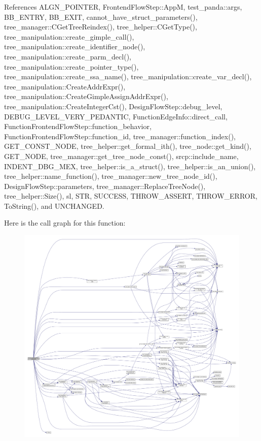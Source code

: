 References A\+L\+G\+N\+\_\+\+P\+O\+I\+N\+T\+ER, Frontend\+Flow\+Step\+::\+AppM, test\+\_\+panda\+::args, B\+B\+\_\+\+E\+N\+T\+RY, B\+B\+\_\+\+E\+X\+IT, cannot\+\_\+have\+\_\+struct\+\_\+parameters(), tree\+\_\+manager\+::\+C\+Get\+Tree\+Reindex(), tree\+\_\+helper\+::\+C\+Get\+Type(), tree\+\_\+manipulation\+::create\+\_\+gimple\+\_\+call(), tree\+\_\+manipulation\+::create\+\_\+identifier\+\_\+node(), tree\+\_\+manipulation\+::create\+\_\+parm\+\_\+decl(), tree\+\_\+manipulation\+::create\+\_\+pointer\+\_\+type(), tree\+\_\+manipulation\+::create\+\_\+ssa\+\_\+name(), tree\+\_\+manipulation\+::create\+\_\+var\+\_\+decl(), tree\+\_\+manipulation\+::\+Create\+Addr\+Expr(), tree\+\_\+manipulation\+::\+Create\+Gimple\+Assign\+Addr\+Expr(), tree\+\_\+manipulation\+::\+Create\+Integer\+Cst(), Design\+Flow\+Step\+::debug\+\_\+level, D\+E\+B\+U\+G\+\_\+\+L\+E\+V\+E\+L\+\_\+\+V\+E\+R\+Y\+\_\+\+P\+E\+D\+A\+N\+T\+IC, Function\+Edge\+Info\+::direct\+\_\+call, Function\+Frontend\+Flow\+Step\+::function\+\_\+behavior, Function\+Frontend\+Flow\+Step\+::function\+\_\+id, tree\+\_\+manager\+::function\+\_\+index(), G\+E\+T\+\_\+\+C\+O\+N\+S\+T\+\_\+\+N\+O\+DE, tree\+\_\+helper\+::get\+\_\+formal\+\_\+ith(), tree\+\_\+node\+::get\+\_\+kind(), G\+E\+T\+\_\+\+N\+O\+DE, tree\+\_\+manager\+::get\+\_\+tree\+\_\+node\+\_\+const(), srcp\+::include\+\_\+name, I\+N\+D\+E\+N\+T\+\_\+\+D\+B\+G\+\_\+\+M\+EX, tree\+\_\+helper\+::is\+\_\+a\+\_\+struct(), tree\+\_\+helper\+::is\+\_\+an\+\_\+union(), tree\+\_\+helper\+::name\+\_\+function(), tree\+\_\+manager\+::new\+\_\+tree\+\_\+node\+\_\+id(), Design\+Flow\+Step\+::parameters, tree\+\_\+manager\+::\+Replace\+Tree\+Node(), tree\+\_\+helper\+::\+Size(), sl, S\+TR, S\+U\+C\+C\+E\+SS, T\+H\+R\+O\+W\+\_\+\+A\+S\+S\+E\+RT, T\+H\+R\+O\+W\+\_\+\+E\+R\+R\+OR, To\+String(), and U\+N\+C\+H\+A\+N\+G\+ED.

Here is the call graph for this function\+:
\nopagebreak
\begin{figure}[H]
\begin{center}
\leavevmode
\includegraphics[width=350pt]{d3/db3/classFixStructsPassedByValue_a30d76d47407cac74933b87bca8bb4292_cgraph}
\end{center}
\end{figure}


